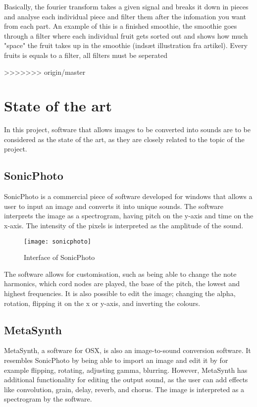 Basically, the fourier transform takes a given signal and breaks it down in pieces and analyse each individual piece and filter them after the infomation you want from each part. An example of this is a finished smoothie, the smoothie goes through a filter where each individual fruit gets sorted out and shows how much "space" the fruit takes up in the smoothie (indsæt illustration fra artikel). Every fruits is equals to a filter, all filters must be seperated 



>>>>>>> origin/master
\section{State of the art}\label{sec:stateart}
In this project, software that allows images to be converted into sounds are to be considered as the state of the art, as they are closely related to the topic of the project.

\subsection{SonicPhoto}\label{sub:sonic}
SonicPhoto \cite{White2013} is a commercial piece of software developed for windows that allows a user to input an image and converts it into unique sounds. The software interprets the image as a spectrogram, having pitch on the y-axis and time on the x-axis. The intensity of the pixels is interpreted as the amplitude of the sound. 

\begin{figure}[!h] 
\centering
\texttt{[image: sonicphoto]}
\caption{\label{fig:sonicphoto} Interface of SonicPhoto \cite{White2013}}
\end{figure}

The software allows for customisation, such as being able to change the note harmonics, which cord nodes are played, the base of the pitch, the lowest and highest frequencies. It is also possible to edit the image; changing the alpha, rotation, flipping it on the x or y-axis, and inverting the colours. 


\subsection{MetaSynth}\label{sub:metasynth}
MetaSynth, a software for OSX, is also an image-to-sound conversion software. It resembles SonicPhoto by being able to import an image and edit it by for example flipping, rotating, adjusting gamma, blurring. However, MetaSynth has additional functionality for editing the output sound, as the user can add effects like  convolution, grain, delay, reverb, and chorus. The image is interpreted as a spectrogram by the software.

